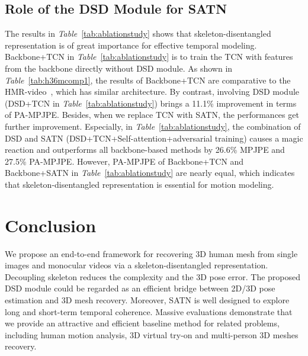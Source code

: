 \documentclass[10pt,twocolumn,letterpaper]{article}
\begin{document}
\subsection{Role of the DSD Module for SATN} 
The results in \textit{Table}~\ref{tab:ablationstudy} shows that skeleton-disentangled representation is of great importance for effective temporal modeling. Backbone+TCN in \textit{Table}~\ref{tab:ablationstudy} is to train the TCN with features from the backbone directly without DSD module. As shown in \textit{Table}~\ref{tab:h36mcomp1}, the results of Backbone+TCN are comparative to the HMR-video~\cite{kanazawa2018learning}, which has similar architecture. By contrast, involving DSD module (DSD+TCN in \textit{Table}~\ref{tab:ablationstudy}) brings a 11.1\% improvement in terms of PA-MPJPE. Besides, when we replace TCN with SATN, the performances get further improvement. Especially, in \textit{Table}~\ref{tab:ablationstudy}, the combination of DSD and SATN  (DSD+TCN+Self-attention+adversarial training) causes a magic reaction and outperforms all backbone-based methods by 26.6\% MPJPE and 27.5\% PA-MPJPE. However, PA-MPJPE of Backbone+TCN and Backbone+SATN in \textit{Table}~\ref{tab:ablationstudy} are nearly equal, which indicates that skeleton-disentangled representation is essential for motion modeling. 

\section{Conclusion}
We propose an end-to-end framework for recovering 3D human mesh from single images and monocular videos via a skeleton-disentangled representation. Decoupling skeleton reduces the complexity and the 3D pose error. The proposed DSD module could be regarded as an efficient bridge between 2D/3D pose estimation and 3D mesh recovery. Moreover, SATN is well designed to explore long and short-term temporal coherence. Massive evaluations demonstrate that we provide an attractive and efficient baseline method for related problems, including human motion analysis, 3D virtual try-on and multi-person 3D meshes recovery. 

{\small


}
\end{document}
